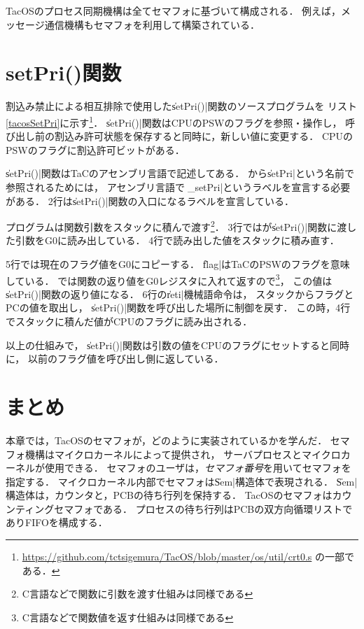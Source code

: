 TacOSのプロセス同期機構は全てセマフォに基づいて構成される．
例えば，メッセージ通信機構もセマフォを利用して構築されている．

\section{setPri()関数}
\label{setPri}
割込み禁止による相互排除で使用した\|setPri()|関数のソースプログラムを
リスト\ref{tacosSetPri}に示す\footnote{
  \url{https://github.com/tctsigemura/TacOS/blob/master/os/util/crt0.s}
  の一部である．}．
\|setPri()|関数はCPUのPSWのフラグを参照・操作し，
呼び出し前の割込み許可状態を保存すると同時に，新しい値に変更する．
CPUのPSWのフラグに割込許可ビットがある．



\|setPri()|関数はTaCのアセンブリ言語で記述してある．
{\cmml}から\|setPri|という名前で参照されるためには，
アセンブリ言語では\|_setPri|というラベルを宣言する必要がある．
2行は\|setPri()|関数の入口になるラベルを宣言している．

{\cmml}プログラムは関数引数をスタックに積んで渡す\footnote{
  C言語などで関数に引数を渡す仕組みは同様である}．
3行では{\cmml}が\|setPri()|関数に渡した引数をG0に読み出している．
4行で読み出した値をスタックに積み直す．

5行では現在のフラグ値をG0にコピーする．
\|flag|はTaCのPSWのフラグを意味している．
{\cmml}では関数の返り値をG0レジスタに入れて返すので\footnote{
  C言語などで関数値を返す仕組みは同様である}，
この値は\|setPri()|関数の返り値になる．
6行の\|reti|機械語命令は，
スタックからフラグとPCの値を取出し，
\|setPri()|関数を呼び出した場所に制御を戻す．
この時，4行でスタックに積んだ値がCPUのフラグに読み出される．

以上の仕組みで，
\|setPri()|関数は引数の値をCPUのフラグにセットすると同時に，
以前のフラグ値を呼び出し側に返している．


\section{まとめ}
本章では，TacOSのセマフォが，どのように実装されているかを学んだ．
セマフォ機構はマイクロカーネルによって提供され，
サーバプロセスとマイクロカーネルが使用できる．
セマフォのユーザは，\emph{セマフォ番号}を用いてセマフォを指定する．
マイクロカーネル内部でセマフォは\|Sem|構造体で表現される．
\|Sem|構造体は，カウンタと，PCBの待ち行列を保持する．
TacOSのセマフォはカウンティングセマフォである．
プロセスの待ち行列はPCBの双方向循環リストでありFIFOを構成する．

